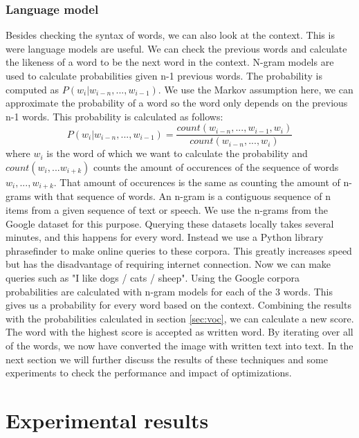 \documentclass{article}
\begin{document}
\subsubsection{Language model}
\label{sec:lm}
Besides checking the syntax of words, we can also look at the context. This is were language models are useful. We can check the previous words and calculate the likeness of a word to be the next word in the context. N-gram models are used to calculate probabilities given n-1 previous words. The probability is computed as $P(w_i | w_{i-n},...,w_{i-1})$. We use the Markov assumption here, we can approximate the probability of a word so the word only depends on the previous n-1 words. This probability is calculated as follows: 
\begin{equation}
        P(w_i | w_{i-n},...,w_{i-1}) = \frac{count(w_{i-n},...,w_{i-1},w_{i})}{count(w_{i-n},...,w_i)}
\end{equation}
where $w_i$ is the word of which we want to calculate the probability and $count(w_i,...w_{i+k})$ counts the amount of occurences of the sequence of words $w_i,...,w_{i+k}$. That amount of occurences is the same as counting the amount of n-grams with that sequence of words. An n-gram is a contiguous sequence of n items from a given sequence of text or speech. \cite{ngram}
We use the n-grams from the Google dataset for this purpose. Querying these datasets locally takes several minutes, and this happens for every word. Instead we use a Python library phrasefinder to make online queries to these corpora. This greatly increases speed but has the disadvantage of requiring internet connection. 
Now we can make queries such as "I like dogs / cats / sheep". Using the Google corpora probabilities are calculated with n-gram models for each of the 3 words. This gives us a probability for every word based on the context. 
Combining the results with the probabilities calculated in section \ref{sec:voc}, we can 
calculate a new score. The word with the highest score is accepted as written word. By iterating over all of the words, we now have converted the image with written text into text. In the next section we will
further discuss the results of these techniques and some experiments to check the performance and impact of optimizations. 
\section{Experimental results}
\end{document}

